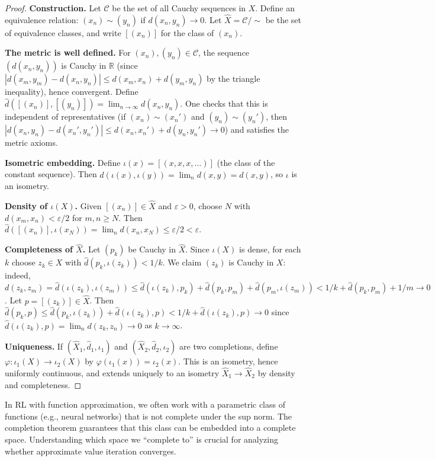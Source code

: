\documentclass[11pt,a4paper]{article}
\theoremstyle{definition}
\theoremstyle{plain}
\theoremstyle{remark}
\newcommand{\R}{\mathbb{R}}
\begin{document}
\begin{proof}
\textbf{Construction.}
Let $\mathcal{C}$ be the set of all Cauchy sequences in $X$. Define an equivalence
relation: $(x_n) \sim (y_n)$ if $d(x_n, y_n) \to 0$. Let
$\hat{X} = \mathcal{C}/{\sim}$ be the set of equivalence classes, and write
$[(x_n)]$ for the class of $(x_n)$.

\textbf{The metric is well defined.}
For $(x_n), (y_n) \in \mathcal{C}$, the sequence $(d(x_n, y_n))$ is Cauchy in $\R$
(since $|d(x_m,y_m) - d(x_n,y_n)| \le d(x_m,x_n) + d(y_m,y_n)$ by the triangle
inequality), hence convergent. Define
$\hat{d}([(x_n)], [(y_n)]) = \lim_{n \to \infty} d(x_n, y_n)$.
One checks that this is independent of representatives (if $(x_n) \sim (x_n')$
and $(y_n) \sim (y_n')$, then $|d(x_n,y_n) - d(x_n',y_n')| \le d(x_n,x_n') +
d(y_n,y_n') \to 0$) and satisfies the metric axioms.

\textbf{Isometric embedding.}
Define $\iota(x) = [(x, x, x, \ldots)]$ (the class of the constant sequence).
Then $\hat{d}(\iota(x), \iota(y)) = \lim_n d(x,y) = d(x,y)$, so $\iota$ is an
isometry.

\textbf{Density of $\iota(X)$.}
Given $[(x_n)] \in \hat{X}$ and $\varepsilon > 0$, choose $N$ with
$d(x_m, x_n) < \varepsilon/2$ for $m, n \ge N$. Then
$\hat{d}([(x_n)], \iota(x_N)) = \lim_n d(x_n, x_N) \le \varepsilon/2 < \varepsilon$.

\textbf{Completeness of $\hat{X}$.}
Let $(p_k)$ be Cauchy in $\hat{X}$. Since $\iota(X)$ is dense, for each $k$ choose
$z_k \in X$ with $\hat{d}(p_k, \iota(z_k)) < 1/k$. We claim $(z_k)$ is Cauchy in
$X$: indeed, $d(z_k, z_m) = \hat{d}(\iota(z_k), \iota(z_m)) \le
\hat{d}(\iota(z_k), p_k) + \hat{d}(p_k, p_m) + \hat{d}(p_m, \iota(z_m)) <
1/k + \hat{d}(p_k, p_m) + 1/m \to 0$. Let $p = [(z_k)] \in \hat{X}$. Then
$\hat{d}(p_k, p) \le \hat{d}(p_k, \iota(z_k)) + \hat{d}(\iota(z_k), p) <
1/k + \hat{d}(\iota(z_k), p) \to 0$ since
$\hat{d}(\iota(z_k), p) = \lim_n d(z_k, z_n) \to 0$ as $k \to \infty$.

\textbf{Uniqueness.}
If $(\hat{X}_1, \hat{d}_1, \iota_1)$ and $(\hat{X}_2, \hat{d}_2, \iota_2)$ are
two completions, define $\varphi \colon \iota_1(X) \to \iota_2(X)$ by
$\varphi(\iota_1(x)) = \iota_2(x)$. This is an isometry, hence uniformly
continuous, and extends uniquely to an isometry $\hat{X}_1 \to \hat{X}_2$ by
density and completeness.
\end{proof}

\begin{rlconnection}
In RL with function approximation, we often work with a parametric class of
functions (e.g., neural networks) that is not complete under the sup norm. The
completion theorem guarantees that this class can be embedded into a complete
space. Understanding which space we ``complete to'' is crucial for analyzing
whether approximate value iteration converges.
\end{rlconnection}
\end{document}
